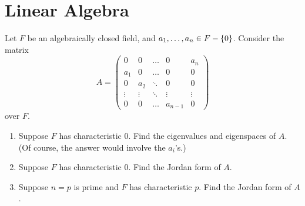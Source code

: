 \section{Linear Algebra}

\begin{question}[subtitle = January 2026 Problem 4,ID=Jan26_4]
Let $F$ be an algebraically closed field, and $a_1, \dots, a_n \in F - \{0\}$. Consider the matrix
\[A = \begin{pmatrix}
0 & 0 & \dots & 0 & a_n \\
a_1 & 0 & \dots & 0 & 0 \\
0 & a_2 & \ddots & 0 & 0 \\
\vdots & \vdots & \ddots & \vdots & \vdots \\
0 & 0 & \dots & a_{n-1} & 0
\end{pmatrix}\]
over $F$.
\begin{enumerate}
    \item Suppose $F$ has characteristic 0. Find the eigenvalues and eigenspaces of $A$. (Of course, the answer would involve the $a_i$'s.)
    \item Suppose $F$ has characteristic 0. Find the Jordan form of $A$.
    \item Suppose $n = p$ is prime and $F$ has characteristic $p$. Find the Jordan form of $A$.
\end{enumerate}
\end{question}
